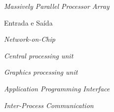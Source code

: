 \documentclass[a5paper]{ufsc-thesis}
\begin{document}
\listoffigures*
\cleardoublepage


\begin{siglas}
  \item[\mppa] \textit{Massively Parallel Processor Array}
  \item[\io] Entrada e Saída
  \item[\noc] \textit{Network-on-Chip}
  \item[\cpu] \textit{Central processing unit}
  \item[\gpu] \textit{Graphics processing unit}
  \item[\api] \textit{Application Programming Interface}
  \item[\ipc] \textit{Inter-Process Communication}
\end{siglas}


\tableofcontents*
\cleardoublepage



\textual






\end{document}
